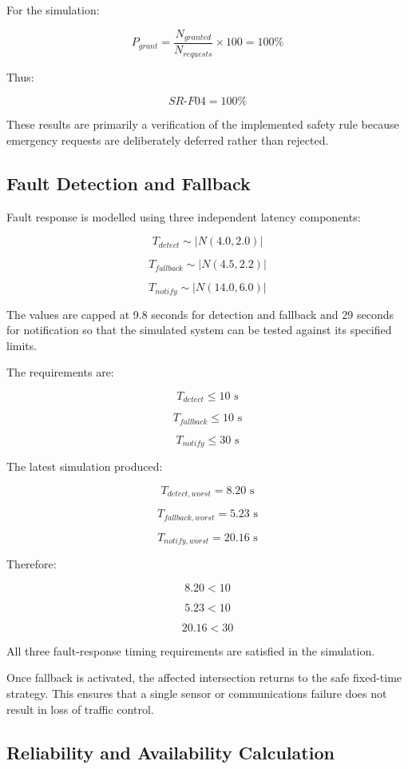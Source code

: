 \documentclass{article}
\begin{document}
For the simulation:

$$
P_{grant}=
\frac{N_{granted}}{N_{requests}}\times100
=100\%
$$

Thus:

$$
\boxed{SR\text{-}F04=100\%}
$$

These results are primarily a verification of the implemented safety rule because emergency requests are deliberately deferred rather than rejected.

\subsection{Fault Detection and Fallback}

Fault response is modelled using three independent latency components:

$$
T_{detect}\sim |N(4.0,2.0)|
$$

$$
T_{fallback}\sim |N(4.5,2.2)|
$$

$$
T_{notify}\sim |N(14.0,6.0)|
$$

The values are capped at 9.8 seconds for detection and fallback and 29 seconds for notification so that the simulated system can be tested against its specified limits.

The requirements are:

$$
T_{detect}\leq10\text{ s}
$$

$$
T_{fallback}\leq10\text{ s}
$$

$$
T_{notify}\leq30\text{ s}
$$

The latest simulation produced:

$$
T_{detect,worst}=8.20\text{ s}
$$

$$
T_{fallback,worst}=5.23\text{ s}
$$

$$
T_{notify,worst}=20.16\text{ s}
$$

Therefore:

$$
8.20<10
$$

$$
5.23<10
$$

$$
20.16<30
$$

All three fault-response timing requirements are satisfied in the simulation.

Once fallback is activated, the affected intersection returns to the safe fixed-time strategy. This ensures that a single sensor or communications failure does not result in loss of traffic control.

\subsection{Reliability and Availability Calculation}
\end{document}
